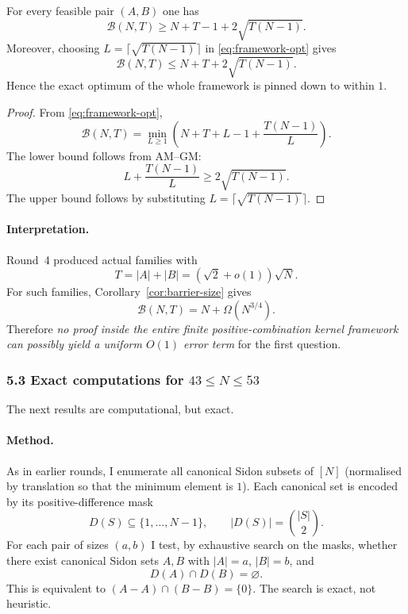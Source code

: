 \begin{corollary}
\label{cor:barrier-size}
For every feasible pair $(A,B)$ one has
\[
\mathcal B(N,T)\ge N+T-1+2\sqrt{T(N-1)}.
\]
Moreover, choosing $L=\lceil \sqrt{T(N-1)}\rceil$ in \eqref{eq:framework-opt} gives
\[
\mathcal B(N,T)\le N+T+2\sqrt{T(N-1)}.
\]
Hence the exact optimum of the whole framework is pinned down to within $1$.
\end{corollary}

\begin{proof}
From \eqref{eq:framework-opt},
\[
\mathcal B(N,T)=\min_{L\ge 1}\left(N+T+L-1+\frac{T(N-1)}{L}\right).
\]
The lower bound follows from AM--GM:
\[
L+\frac{T(N-1)}{L}\ge 2\sqrt{T(N-1)}.
\]
The upper bound follows by substituting $L=\lceil \sqrt{T(N-1)}\rceil$.
\end{proof}

\paragraph{Interpretation.}
Round~4 produced actual families with
\[
T=|A|+|B|=(\sqrt2+o(1))\sqrt N.
\]
For such families, Corollary~\ref{cor:barrier-size} gives
\[
\mathcal B(N,T)=N+\Omega(N^{3/4}).
\]
Therefore \emph{no proof inside the entire finite positive-combination kernel framework can possibly yield a uniform $O(1)$ error term} for the first question.

\subsubsection{5.3 Exact computations for \texorpdfstring{$43\le N\le 53$}{43<=N<=53}}

The next results are computational, but exact.

\paragraph{Method.}
As in earlier rounds, I enumerate all canonical Sidon subsets of $[N]$ (normalised by translation so that the minimum element is $1$).  Each canonical set is encoded by its positive-difference mask
\[
D(S)\subseteq \{1,\dots,N-1\},
\qquad |D(S)|=\binom{|S|}{2}.
\]
For each pair of sizes $(a,b)$ I test, by exhaustive search on the masks, whether there exist canonical Sidon sets $A,B$ with $|A|=a$, $|B|=b$, and
\[
D(A)\cap D(B)=\varnothing.
\]
This is equivalent to $(A-A)\cap(B-B)=\{0\}$.  The search is exact, not heuristic.

